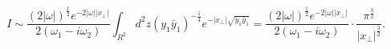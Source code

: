 \begin{equation}
I\sim\frac{(2|\omega|)^{\frac{1}{2}}
e^{-2|\omega||x_\perp|}
}{2(\omega_1-i\omega_2)}
\int_{R^2}d^2z(y_1\bar y_1)^{-\frac{1}{4}}e^{-|x_\perp|\sqrt{y_1\bar y_1}}
=\frac{(2|\omega|)^{\frac{1}{2}}
e^{-2|\omega||x_\perp|}
}{2(\omega_1-i\omega_2)}\cdot
\frac{\pi^{\frac{3}{2}}}{|x_\perp|^{\frac{3}{2}}}.
\end{equation}

